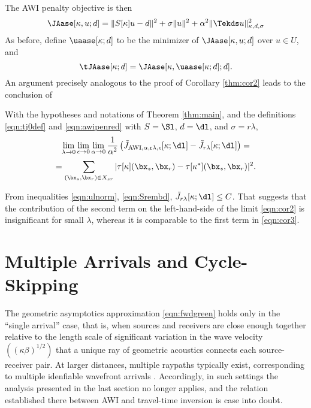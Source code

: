 The AWI penalty objective is then
\begin{equation}
  \label{eqn:awipen}
  \JAase[\kappa,u;d] = \|S[\kappa]u-d\|^2 + \sigma\|u\|^2 + \alpha^2
  \|\Tekds u\|_{\kappa,d,\sigma}^2
\end{equation}
As before, define $\uaase[\kappa;d]$ to be the minimizer of
$\JAase[\kappa,u;d]$ over $u \in U$, and
\begin{equation}
  \label{eqn:awipenred}
  \tJAase[\kappa;d] =\JAase[\kappa,\uaase[\kappa;d];d].
\end{equation}
An argument precisely analogous to the proof of Corollary
\ref{thm:cor2} leads to the conclusion of
\begin{cor}
  \label{thm:cor3}
  With the hypotheses and notations of Theorem \ref{thm:main}, and the
  definitions \ref{eqn:tj0def} and \ref{eqn:awipenred} with $S=\Sl$,
  $d=\dl$, and $\sigma=r\lambda$,
  \[
  \lim_{\lambda \rightarrow 0}\lim_{\epsilon \rightarrow 0}\lim_{\alpha \rightarrow 0}
  \frac{1}{\alpha^2}\left(\tilde{J}_{\rm AWI,\alpha,r\lambda,\epsilon}[\kappa;\dl]-\tilde{J}_{r\lambda}[\kappa;\dl]\right)=
  \]
  \begin{equation}
    \label{eqn:cor3}
    = \sum_{(\bx_s,\bx_r) \in X_{sr}} |\tau[\kappa](\bx_s,\bx_r) - \tau[\kappa^*](\bx_s,\bx_r)|^2.
  \end{equation}
\end{cor}

 From inequalities \ref{eqn:ulnorm},
\ref{eqn:Srembd}, $\tilde{J}_{r\lambda}[\kappa;\dl] \le C$. That
suggests that the contribution of the second term on the
left-hand-side of the limit \ref{eqn:cor2} is insignificant for small
$\lambda$, whereas it is comparable to the first term in
\ref{eqn:cor3}. 



\section{Multiple Arrivals and Cycle-Skipping}
The geometric asymptotics approximation \ref{eqn:fwdgreen} holds only
in the ``single arrival'' case, that is, when sources and receivers
are close enough together relative to the length scale of significant
variation in the wave velocity $((\kappa\beta)^{1/2})$ that a unique ray of
geometric acoustics connects each source-receiver pair. At larger
distances, multiple raypaths typically exist, corresponding to
multiple idenfiable wavefront arrivals \cite[]{Whi:82}. Accordingly, in such settings
the analysis presented in the last section no longer applies, and the
relation established there between AWI and travel-time inversion is
case into doubt.

